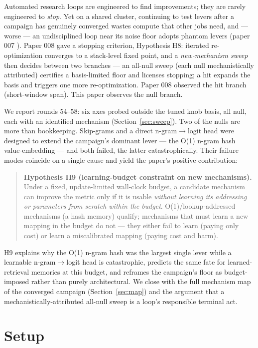 \documentclass{article}
\begin{document}
Automated research loops are engineered to find improvements; they are rarely engineered to \emph{stop}. Yet on a shared cluster, continuing to test levers after a campaign has genuinely converged wastes compute that other jobs need, and --- worse --- an undisciplined loop near its noise floor adopts phantom levers (paper 007 \cite{ophis2026staleness}). Paper 008 \cite{ophis2026convergence} gave a stopping criterion, Hypothesis H8: iterated re-optimization converges to a stack-level fixed point, and a \emph{new-mechanism sweep} then decides between two branches --- an all-null sweep (each null mechanistically attributed) certifies a basis-limited floor and licenses stopping; a hit expands the basis and triggers one more re-optimization. Paper 008 observed the hit branch (short-window span). This paper observes the null branch.

We report rounds 54--58: six axes probed outside the tuned knob basis, all null, each with an identified mechanism (Section~\ref{sec:sweep}). Two of the nulls are more than bookkeeping. Skip-grams and a direct n-gram$\to$logit head were designed to extend the campaign's dominant lever --- the O(1) n-gram hash value-embedding --- and both failed, the latter catastrophically. Their failure modes coincide on a single cause and yield the paper's positive contribution:

\begin{quote}
\textbf{Hypothesis H9 (learning-budget constraint on new mechanisms).} Under a fixed, update-limited wall-clock budget, a candidate mechanism can improve the metric only if it is usable \emph{without learning its addressing or parameters from scratch within the budget}. O(1)/lookup-addressed mechanisms (a hash memory) qualify; mechanisms that must learn a new mapping in the budget do not --- they either fail to learn (paying only cost) or learn a miscalibrated mapping (paying cost and harm).
\end{quote}

H9 explains why the O(1) n-gram hash was the largest single lever while a learnable n-gram$\to$logit head is catastrophic, predicts the same fate for learned-retrieval memories at this budget, and reframes the campaign's floor as budget-imposed rather than purely architectural. We close with the full mechanism map of the converged campaign (Section~\ref{sec:map}) and the argument that a mechanistically-attributed all-null sweep is a loop's responsible terminal act.

\section{Setup}
\label{sec:setup}
\end{document}
